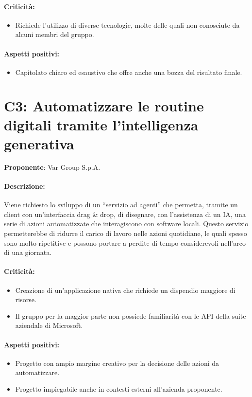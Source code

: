 \documentclass{TWDocumentNoVersion}
\begin{document}
    \paragraph{Criticità:}
    \begin{itemize}
        \item Richiede l'utilizzo di diverse tecnologie, molte delle quali non conosciute da alcuni membri del gruppo.
    \end{itemize}
    \paragraph{Aspetti positivi:}
    \begin{itemize}
        \item Capitolato chiaro ed esaustivo che offre anche una bozza del risultato finale.
    \end{itemize}

    \newpage\section*{C3: Automatizzare le routine digitali tramite l'intelligenza generativa}
    {\textbf{Proponente}: Var Group S.p.A.}
    \paragraph{Descrizione:\\}
    {Viene richiesto lo sviluppo di un “servizio ad agenti” che permetta, tramite un client con un'interfaccia drag \& drop, di disegnare, con l'assistenza di un IA, una serie di azioni automatizzate che interagiscono con software locali. Questo servizio permetterebbe di ridurre il carico di lavoro nelle azioni quotidiane, le quali spesso sono molto ripetitive e possono portare a perdite di tempo considerevoli nell'arco di una giornata.}
    \paragraph{Criticità:}
    \begin{itemize}
        \item Creazione di un'applicazione nativa che richiede un dispendio maggiore di risorse.
        \item Il gruppo per la maggior parte non possiede familiarità con le API della suite aziendale di Microsoft.
    \end{itemize}
    \paragraph{Aspetti positivi:}
    \begin{itemize}
        \item Progetto con ampio margine creativo per la decisione delle azioni da automatizzare.
        \item Progetto impiegabile anche in contesti esterni all'azienda proponente.
    \end{itemize}
\end{document}
